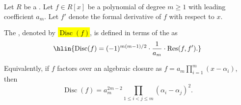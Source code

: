 \begin{definition} \label{definition:discriminant_of_a_polynomial_over_a_commutative_ring}
    Let $R$ be a . Let $f \in R[x]$ be a polynomial of degree $m \geq 1$ with leading coefficient $a_m$. Let $f'$ denote the formal derivative of $f$ with respect to $x$.

    The , denoted by \hl{$\operatorname{Disc}(f)$}, is defined in terms of the  as
    $$ \hlin{\operatorname{Disc}(f) = (-1)^{m(m-1)/2} \cdot \frac{1}{a_m} \cdot \operatorname{Res}(f, f').} $$

    Equivalently, if $f$ factors over an algebraic closure as $f = a_m \prod_{i=1}^m (x - \alpha_i)$, then
    $$ \operatorname{Disc}(f) = a_m^{2m-2} \prod_{1 \leq i < j \leq m} (\alpha_i - \alpha_j)^2. $$
\end{definition}
